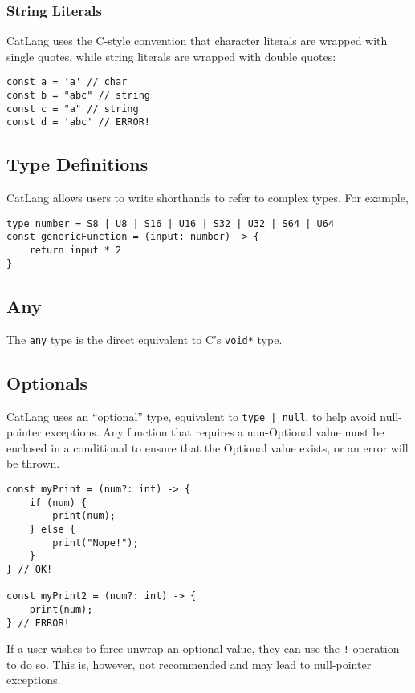\documentclass[12pt]{article}
\begin{document}
\subsubsection{String Literals}

CatLang uses the C-style convention that character literals are wrapped with single quotes, while string literals are wrapped with double quotes:

\begin{lstlisting}
const a = 'a' // char
const b = "abc" // string
const c = "a" // string
const d = 'abc' // ERROR!
\end{lstlisting}

\subsection{Type Definitions}
CatLang allows users to write shorthands to refer to complex types. For example,

\begin{lstlisting}
type number = S8 | U8 | S16 | U16 | S32 | U32 | S64 | U64
const genericFunction = (input: number) -> {
	return input * 2
}
\end{lstlisting}

\subsection{Any}

The \lstinline!any! type is the direct equivalent to C's \lstinline!void*! type.

\subsection{Optionals}

CatLang uses an ``optional'' type, equivalent to \lstinline!type | null!, to help avoid null-pointer exceptions. Any function that requires a non-Optional value must be enclosed in a conditional to ensure that the Optional value exists, or an error will be thrown.

\begin{lstlisting}
const myPrint = (num?: int) -> {
	if (num) {
		print(num);
	} else {
		print("Nope!");
	}
} // OK!

const myPrint2 = (num?: int) -> {
	print(num);
} // ERROR!
\end{lstlisting}

If a user wishes to force-unwrap an optional value, they can use the \lstinline$!$ operation to do so. This is, however, not recommended and may lead to null-pointer exceptions.
\end{document}
